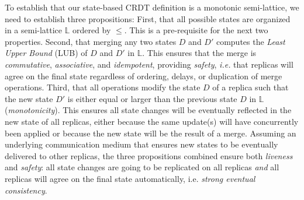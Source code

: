 \documentclass[11pt, oneside]{article}   	%
\begin{document}
To establish that our state-based CRDT definition is a monotonic semi-lattice, we need to establish three propositions: First, that all possible states are organized in a semi-lattice $\mathds{L}$ ordered by $\leq$. This is a pre-requisite for the next two properties. Second, that merging any two states $D$ and $D'$ computes the \textit{Least Upper Bound} (LUB) of $D$ and $D'$ in $\mathds{L}$. This ensures that the merge is \textit{commutative}, \textit{associative}, and \textit{idempotent}, providing \textit{safety}, \textit{i.e.} that replicas will agree on the final state regardless of ordering, delays, or duplication of merge operations. Third, that all operations modify the state $D$ of a replica such that the new state $D'$ is either equal or larger than the previous state $D$ in $\mathds{L}$ (\textit{monotonicity}). This ensures all state changes will be eventually reflected in the new state of all replicas, either because the same update(s) will have concurrently been applied or because the new state will be the result of a merge. Assuming an underlying communication medium that ensures new states to be eventually delivered to other replicas, the three propositions combined ensure both \textit{liveness} and \textit{safety}: all state changes are going to be replicated on all replicas \textit{and} all replicas will agree on the final state automatically, i.e. \textit{strong eventual consistency}.



\end{document}
